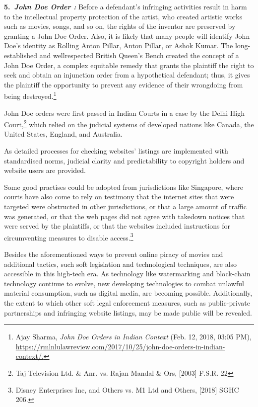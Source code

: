 \begin{multicols}{2}
\noi
{\large \bfseries 5.~\textit{John Doe Order :}} Before a defendant's infringing activities result in harm to the
intellectual property protection of the artist, who created artistic works such as movies, songs, and so on, the rights of the inventor are preserved by granting a John
Doe Order. Also, it is likely that many people will identify John Doe's identity as
Rolling Anton Pillar, Anton Pillar, or Ashok Kumar. The long-established and wellrespected British Queen's Bench created the concept of a John Doe Order, a complex
equitable remedy that grants the plaintiff the right to seek and obtain an injunction
order from a hypothetical defendant; thus, it gives the plaintiff the opportunity to
prevent any evidence of their wrongdoing from being destroyed.\footnote{Ajay Sharma, \textit{John Doe Orders in Indian Context} (Feb. 12, 2018, 03:05 PM), \url{https://rmlnlulawreview.com/2017/10/25/john-doe-orders-in-indian-context/.}}

\noi
John Doe orders were first passed in Indian Courts in a case by the Delhi High Court,\footnote{Taj Television Ltd. \& Anr. vs. Rajan Mandal \& Ors, [2003] F.S.R. 22} which relied on the judicial systems of developed nations like Canada, the United States, England, and Australia.

\noi
As detailed processes for checking websites' listings are implemented with standardised
norms, judicial clarity and predictability to copyright holders and website users are provided.

\noi
Some good practises could be adopted from jurisdictions like Singapore, where courts have
also come to rely on testimony that the internet sites that were targeted were obstructed in
other jurisdictions, or that a large amount of traffic was generated, or that the web pages did
not agree with takedown notices that were served by the plaintiffs, or that the websites
included instructions for circumventing measures to disable access.\footnote{Disney Enterprises Inc, and Others vs. M1 Ltd and Others, [2018] SGHC 206.}

\noi
Besides the aforementioned ways to prevent online piracy of movies and additional tactics,
such soft legislation and technological techniques, are also accessible in this high-tech era. As
technology like watermarking and block-chain technology continue to evolve, new
developing technologies to combat unlawful material consumption, such as digital media, are
becoming possible. Additionally, the extent to which other soft legal enforcement measures,
such as public-private partnerships and infringing website listings, may be made public will
be revealed.


\end{multicols}

